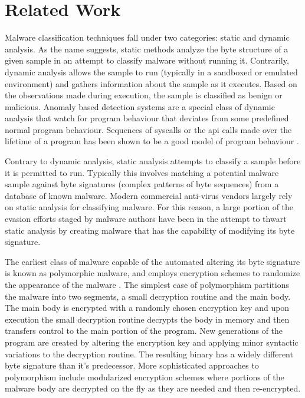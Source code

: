\chapter{Related Work}

    Malware classification techniques fall under two categories: static and
    dynamic analysis. As the name suggests, static methods analyze the byte
    structure of a given sample in an attempt to classify malware without
    running it. Contrarily, dynamic analysis allows the sample to run (typically
    in a sandboxed or emulated environment) and gathers information about the
    sample as it executes. Based on the observations made during execution, the
    sample is classified as benign or malicious. Anomaly based detection
    systems are a special class of dynamic analysis that watch for program
    behaviour that deviates from some predefined normal program behaviour.
    Sequences of syscalls or the api calls made over the lifetime of a program
    has been shown to be a good model of program behaviour \cite{api_calls}.

    Contrary to dynamic analysis, static analysis attempts to classify a sample
    before it is permitted to run. Typically this involves matching a potential
    malware sample against byte signatures (complex patterns of byte sequences)
    from a database of known malware.  Modern commercial anti-virus vendors
    largely rely on static analysis for classifying malware. For this reason, a
    large portion of the evasion efforts staged by malware authors have been in
    the attempt to thwart static analysis by creating malware that has the
    capability of modifying its byte signature.

    The earliest class of malware capable of the automated altering its byte
    signature is known as polymorphic malware, and employs encryption schemes to
    randomize the appearance of the malware \cite{simile}.  The simplest case of
    polymorphism partitions the malware into two segments, a small decryption
    routine and the main body. The main body is encrypted with a randomly chosen
    encryption key and upon execution the small decryption routine decrypts the
    body in memory and then transfers control to the main portion of the
    program.  New generations of the program are created by altering the
    encryption key and applying minor syntactic variations to the decryption
    routine. The resulting binary has a widely different byte signature than
    it's predecessor.  More sophisticated approaches to polymorphism include
    modularized encryption schemes where portions of the malware body are
    decrypted on the fly as they are needed and then re-encrypted.

